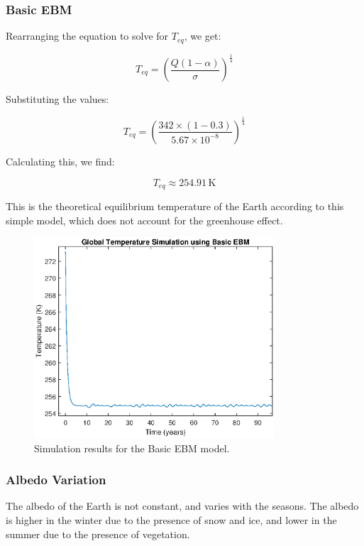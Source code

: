 \documentclass[12pt]{article}
\begin{document}
\subsubsection{Basic EBM}

Rearranging the equation to solve for $T_{eq}$, we get:

\begin{equation}
T_{eq} = \left( \frac{Q(1 - \alpha)}{\sigma} \right)^{\frac{1}{4}}
\end{equation}

Substituting the values:

\begin{equation}
T_{eq} = \left( \frac{342 \times (1 - 0.3)}{5.67 \times 10^{-8}} \right)^{\frac{1}{4}}
\end{equation}

Calculating this, we find:

\begin{equation}
T_{eq} \approx 254.91 \, \text{K}
\end{equation}

This is the theoretical equilibrium temperature of the Earth according to this simple model, which does not account for the greenhouse effect.


\begin{figure}[ht]
\centering
\includegraphics[width=0.8\textwidth]{ebm_basic.eps}
\caption{Simulation results for the Basic EBM model.}
\label{fig:basicEBM}
\end{figure}

\subsubsection{Albedo Variation}
The albedo of the Earth is not constant, 
and varies with the seasons. 
The albedo is higher in the winter due to the presence of snow and ice, 
and lower in the summer due to the presence of vegetation. 
\end{document}

